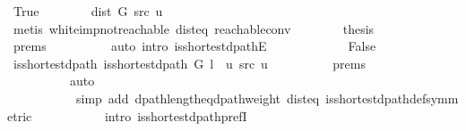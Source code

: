 \begin{isabellebody}
\ True\isanewline
\ \ \ \ \ \ \isamarkupfalse%
\ {\isachardoublequoteopen}dist\ G\ src\ u\ {\isacharequal}{\kern0pt}\ {\isasyminfinity}{\isachardoublequoteclose}\isanewline
\ \ \ \ \ \ \ \ \isamarkupfalse%
\ {\isacharparenleft}{\kern0pt}metis\ white{\isacharunderscore}{\kern0pt}imp{\isacharunderscore}{\kern0pt}not{\isacharunderscore}{\kern0pt}reachable\ dist{\isacharunderscore}{\kern0pt}eq{\isacharunderscore}{\kern0pt}{\isasymdelta}\ {\isasymdelta}{\isacharunderscore}{\kern0pt}reachable{\isacharunderscore}{\kern0pt}conv{\isacharparenright}{\kern0pt}\isanewline
\ \ \ \ \ \ \isamarkupfalse%
\ {\isacharquery}{\kern0pt}thesis\isanewline
\ \ \ \ \ \ \ \ \isamarkupfalse%
\ {\isachardoublequoteopen}{}{\isachardot}{\kern0pt}prems{\isachardoublequoteclose}{\isacharparenleft}{\kern0pt}{}{\isacharparenright}{\kern0pt}\isanewline
\ \ \ \ \ \ \ \ \isamarkupfalse%
\ {\isacharparenleft}{\kern0pt}auto\ intro{\isacharcolon}{\kern0pt}\ is{\isacharunderscore}{\kern0pt}shortest{\isacharunderscore}{\kern0pt}dpathE{\isacharunderscore}{\kern0pt}{}{\isacharparenright}{\kern0pt}\isanewline
\ \ \ \ \isamarkupfalse%
\isanewline
\ \ \ \ \ \ \isamarkupfalse%
\ False\isanewline
\ \ \ \ \ \ \isamarkupfalse%
\ is{\isacharunderscore}{\kern0pt}shortest{\isacharunderscore}{\kern0pt}dpath{\isacharcolon}{\kern0pt}\ {\isachardoublequoteopen}is{\isacharunderscore}{\kern0pt}shortest{\isacharunderscore}{\kern0pt}dpath\ G\ {\isacharparenleft}{\kern0pt}l\ {\isacharat}{\kern0pt}\ {\isacharbrackleft}{\kern0pt}u{\isacharbrackright}{\kern0pt}{\isacharparenright}{\kern0pt}\ src\ u{\isachardoublequoteclose}\isanewline
\ \ \ \ \ \ \ \ \isamarkupfalse%
\ {\isachardoublequoteopen}{}{\isachardot}{\kern0pt}prems{\isachardoublequoteclose}{\isacharparenleft}{\kern0pt}{}{\isacharparenright}{\kern0pt}\isanewline
\ \ \ \ \ \ \ \ \isamarkupfalse%
\isanewline
\ \ \ \ \ \ \ \ \ \ {\isacharparenleft}{\kern0pt}auto\isanewline
\ \ \ \ \ \ \ \ \ \ \ simp\ add{\isacharcolon}{\kern0pt}\ dpath{\isacharunderscore}{\kern0pt}length{\isacharunderscore}{\kern0pt}eq{\isacharunderscore}{\kern0pt}dpath{\isacharunderscore}{\kern0pt}weight\ dist{\isacharunderscore}{\kern0pt}eq{\isacharunderscore}{\kern0pt}{\isasymdelta}\ is{\isacharunderscore}{\kern0pt}shortest{\isacharunderscore}{\kern0pt}dpath{\isacharunderscore}{\kern0pt}def{\isacharbrackleft}{\kern0pt}symmetric{\isacharbrackright}{\kern0pt}\isanewline
\ \ \ \ \ \ \ \ \ \ \ intro{\isacharcolon}{\kern0pt}\ is{\isacharunderscore}{\kern0pt}shortest{\isacharunderscore}{\kern0pt}dpath{\isacharunderscore}{\kern0pt}prefI{\isacharparenright}{\kern0pt}\isanewline

\end{isabellebody}
